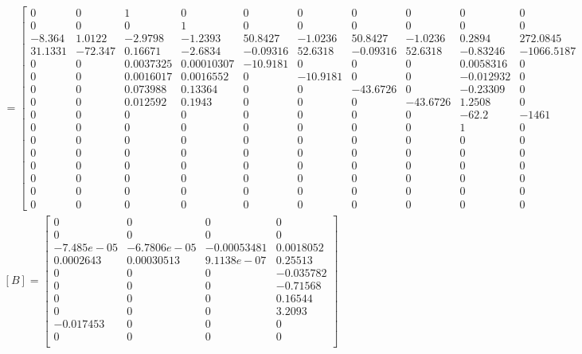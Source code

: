 \begin{landscape}
\setcounter{MaxMatrixCols}{20}
\tiny
\begin{gather*}
	[A] = \begin{bmatrix}
		0&0&1&0&0&0&0&0&0&0&0&0&0&0&0&0\\
		0&0&0&1&0&0&0&0&0&0&0&0&0&0&0&0\\
		-8.364&1.0122&-2.9798&-1.2393&50.8427&-1.0236&50.8427&-1.0236&0.2894&272.0845&0.28238&226.0819&3.918&1895.4093&18.1004&700.7528\\
		31.1331&-72.347&0.16671&-2.6834&-0.09316&52.6318&-0.09316&52.6318&-0.83246&-1066.5187&-1.5058&-1130.5021&-0.0066816&-3.2323&-993.5842&-117723.7787\\
		0&0&0.0037325&0.00010307&-10.9181&0&0&0&0.0058316&0&0.0032023&0&0.018892&0&361.788&21281.6465\\
		0&0&0.0016017&0.0016552&0&-10.9181&0&0&-0.012932&0&-0.0020412&0&2.3027e-06&0&7236.2386&425661.0967\\
		0&0&0.073988&0.13364&0&0&-43.6726&0&-0.23309&0&-0.15955&0&-0.77141&0&-1672.7635&-98397.8538\\
		0&0&0.012592&0.1943&0&0&0&-43.6726&1.2508&0&0.84331&0&-9.373e-05&0&-32449.5405&-1908796.5027\\
		0&0&0&0&0&0&0&0&-62.2&-1461&0&0&0&0&0&0\\
		0&0&0&0&0&0&0&0&1&0&0&0&0&0&0&0\\
		0&0&0&0&0&0&0&0&0&0&-62.2&-1461&0&0&0&0\\
		0&0&0&0&0&0&0&0&0&0&1&0&0&0&0&0\\
		0&0&0&0&0&0&0&0&0&0&0&0&-62.2&-1461&0&0\\
		0&0&0&0&0&0&0&0&0&0&0&0&1&0&0&0\\
		0&0&0&0&0&0&0&0&0&0&0&0&0&0&-176.4706&-10380.6228\\
		0&0&0&0&0&0&0&0&0&0&0&0&0&0&1&0
	\end{bmatrix} \\
	[B] = \begin{bmatrix}
		0&0&0&0\\
		0&0&0&0\\
		-7.485e-05&-6.7806e-05&-0.00053481&0.0018052\\
		0.0002643&0.00030513&9.1138e-07&0.25513\\
		0&0&0&-0.035782\\
		0&0&0&-0.71568\\
		0&0&0&0.16544\\
		0&0&0&3.2093\\
		-0.017453&0&0&0\\
		0&0&0&0\\

\end{bmatrix}
\end{gather*}
\end{landscape}
